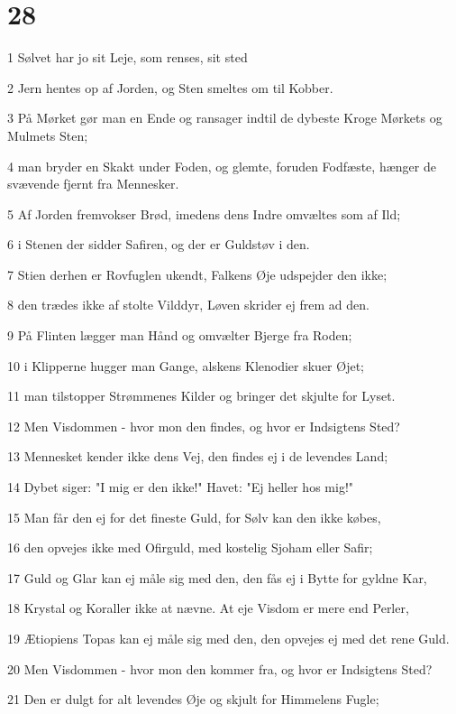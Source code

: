 \chapter{28}

\par 1 Sølvet har jo sit Leje, som renses, sit sted
\par 2 Jern hentes op af Jorden, og Sten smeltes om til Kobber.
\par 3 På Mørket gør man en Ende og ransager indtil de dybeste Kroge Mørkets og Mulmets Sten;
\par 4 man bryder en Skakt under Foden, og glemte, foruden Fodfæste, hænger de svævende fjernt fra Mennesker.
\par 5 Af Jorden fremvokser Brød, imedens dens Indre omvæltes som af Ild;
\par 6 i Stenen der sidder Safiren, og der er Guldstøv i den.
\par 7 Stien derhen er Rovfuglen ukendt, Falkens Øje udspejder den ikke;
\par 8 den trædes ikke af stolte Vilddyr, Løven skrider ej frem ad den.
\par 9 På Flinten lægger man Hånd og omvælter Bjerge fra Roden;
\par 10 i Klipperne hugger man Gange, alskens Klenodier skuer Øjet;
\par 11 man tilstopper Strømmenes Kilder og bringer det skjulte for Lyset.
\par 12 Men Visdommen - hvor mon den findes, og hvor er Indsigtens Sted?
\par 13 Mennesket kender ikke dens Vej, den findes ej i de levendes Land;
\par 14 Dybet siger: "I mig er den ikke!" Havet: "Ej heller hos mig!"
\par 15 Man får den ej for det fineste Guld, for Sølv kan den ikke købes,
\par 16 den opvejes ikke med Ofirguld, med kostelig Sjoham eller Safir;
\par 17 Guld og Glar kan ej måle sig med den, den fås ej i Bytte for gyldne Kar,
\par 18 Krystal og Koraller ikke at nævne. At eje Visdom er mere end Perler,
\par 19 Ætiopiens Topas kan ej måle sig med den, den opvejes ej med det rene Guld.
\par 20 Men Visdommen - hvor mon den kommer fra, og hvor er Indsigtens Sted?
\par 21 Den er dulgt for alt levendes Øje og skjult for Himmelens Fugle;
